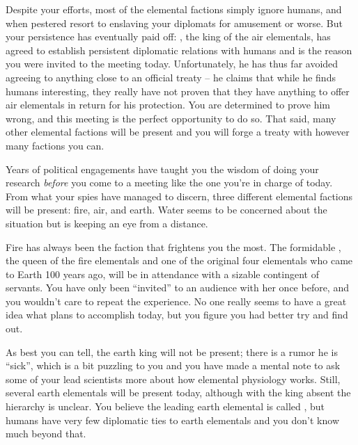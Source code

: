 \documentclass[char]{elementals}
\begin{document}
Despite your efforts, most of the elemental factions simply ignore humans, and when pestered resort to enslaving your diplomats for amusement or worse. But your persistence has eventually paid off: \cKing{\intro}, the king of the air elementals, has agreed to establish persistent diplomatic relations with humans and is the reason you were invited to the meeting today. Unfortunately, he has thus far avoided agreeing to anything close to an official treaty -- he claims that while he finds humans interesting, they really have not proven that they have anything to offer air elementals in return for his protection. You are determined to prove him wrong, and this meeting is the perfect opportunity to do so. That said, many other elemental factions will be present and you will forge a treaty with however many factions you can.

Years of political engagements have taught you the wisdom of doing your research \emph{before} you come to a meeting like the one you're in charge of today. From what your spies have managed to discern, three different elemental factions will be present: fire, air, and earth. Water seems to be concerned about the situation but is keeping an eye from a distance.


Fire has always been the faction that frightens you the most. The formidable \cQueen{\intro}, the queen of the fire elementals and one of the original four elementals who came to Earth 100 years ago, will be in attendance with a sizable contingent of servants. You have only been ``invited'' to an audience with her once before, and you wouldn't care to repeat the experience. No one really seems to have a great idea what \cQueen{} plans to accomplish today, but you figure you had better try and find out.

As best you can tell, the earth king will not be present; there is a rumor he is ``sick'', which is a bit puzzling to you and you have made a mental note to ask some of your lead scientists more about how elemental physiology works. Still, several earth elementals will be present today, although with the king absent the hierarchy is unclear. You believe the leading earth elemental is called \cLoyal{\intro}, but humans have very few diplomatic ties to earth elementals and you don't know much beyond that.
\end{document}
